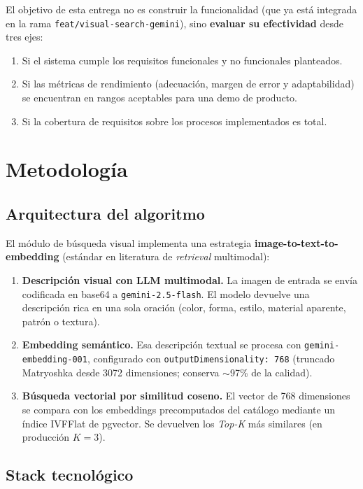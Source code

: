 \documentclass[11pt,letterpaper]{article}
\begin{document}
El objetivo de esta entrega no es construir la funcionalidad (que ya está integrada en la rama \texttt{feat/visual-search-gemini}), sino \textbf{evaluar su efectividad} desde tres ejes:
\begin{enumerate}[leftmargin=*]
  \item Si el sistema cumple los requisitos funcionales y no funcionales planteados.
  \item Si las métricas de rendimiento (adecuación, margen de error y adaptabilidad) se encuentran en rangos aceptables para una demo de producto.
  \item Si la cobertura de requisitos sobre los procesos implementados es total.
\end{enumerate}

\section{Metodología}

\subsection{Arquitectura del algoritmo}

El módulo de búsqueda visual implementa una estrategia \textbf{image-to-text-to-embedding} (estándar en literatura de \textit{retrieval} multimodal):

\begin{enumerate}[leftmargin=*]
  \item \textbf{Descripción visual con LLM multimodal.} La imagen de entrada se envía codificada en base64 a \texttt{gemini-2.5-flash}. El modelo devuelve una descripción rica en una sola oración (color, forma, estilo, material aparente, patrón o textura).
  \item \textbf{Embedding semántico.} Esa descripción textual se procesa con \texttt{gemini-embedding-001}, configurado con \texttt{outputDimensionality: 768} (truncado Matryoshka desde 3072 dimensiones; conserva $\sim$97\% de la calidad).
  \item \textbf{Búsqueda vectorial por similitud coseno.} El vector de 768 dimensiones se compara con los embeddings precomputados del catálogo mediante un índice IVFFlat de pgvector. Se devuelven los \textit{Top-K} más similares (en producción $K=3$).
\end{enumerate}

\subsection{Stack tecnológico}
\end{document}
